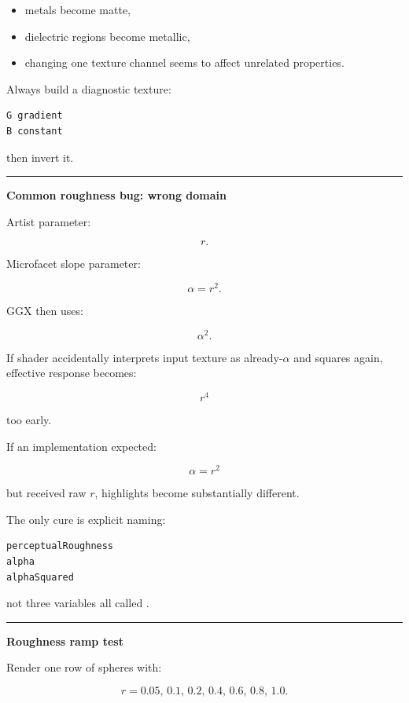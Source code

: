 \begin{itemize}
\tightlist
\item
  metals become matte,
\item
  dielectric regions become metallic,
\item
  changing one texture channel seems to affect unrelated properties.
\end{itemize}

Always build a diagnostic texture:

\begin{verbatim}
G gradient
B constant
\end{verbatim}

then invert it.

\begin{center}\rule{0.5\linewidth}{0.5pt}\end{center}

\textbf{Common roughness bug: wrong domain}

Artist parameter:

\[
r.
\]

Microfacet slope parameter:

\[
\alpha=r^2.
\]

GGX then uses:

\[
\alpha^2.
\]

If shader accidentally interprets input texture as already-\(\alpha\) and squares again, effective response becomes:

\[
r^4
\]

too early.

If an implementation expected:

\[
\alpha=r^2
\]

but received raw \(r\), highlights become substantially different.

The only cure is explicit naming:

\begin{verbatim}
perceptualRoughness
alpha
alphaSquared
\end{verbatim}

not three variables all called .

\begin{center}\rule{0.5\linewidth}{0.5pt}\end{center}

\textbf{Roughness ramp test}

Render one row of spheres with:

\[
r=
0.05,\,
0.1,\,
0.2,\,
0.4,\,
0.6,\,
0.8,\,
1.0.
\]

